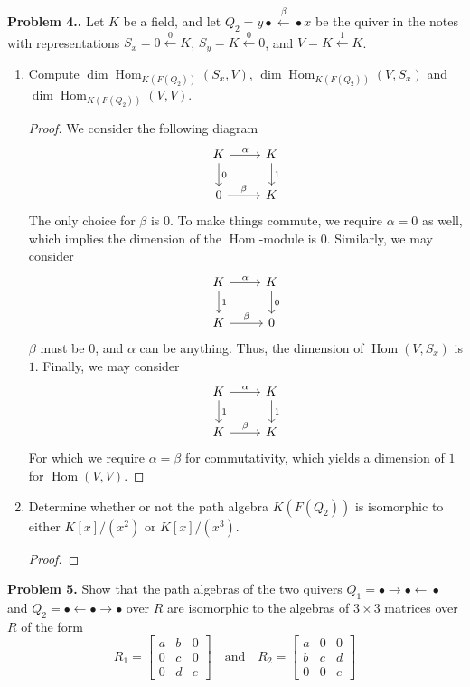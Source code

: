 \documentclass[reqno]{amsart}
\DeclareMathOperator{\Hom}{Hom}
\theoremstyle{definition}
\theoremstyle{remark}
\newcommand{\prob}[1] {
  \textbf{Problem #1.}
}
\begin{document}
\prob{4.} Let $K$ be a field, and let $Q_2 = y \bullet \xleftarrow{\beta}
\bullet x$ be the quiver in the notes with representations $S_x = 0
\xleftarrow{0} K$, $S_y = K \xleftarrow{0} 0$, and $V = K \xleftarrow{1} K$.

\begin{enumerate}
  \item Compute $\dim \Hom_{K(F(Q_2))}(S_x, V)$, $\dim \Hom_{K(F(Q_2))}(V, S_x)$
    and $\dim \Hom_{K(F(Q_2))}(V, V)$.
    \begin{proof}
      We consider the following diagram
      \[
        \begin{tikzcd}
          K \ar[d, "0"] \ar[r, "\alpha"] & K \ar[d, "1"] \\
          0 \ar[r, "\beta"] & K
        \end{tikzcd}
      \]
      The only choice for $\beta$ is $0$. To make things commute, we require
      $\alpha = 0$ as well, which implies the dimension of the $\Hom$-module is
      $0$. Similarly, we may consider
      \[
        \begin{tikzcd}
          K \ar[d, "1"] \ar[r, "\alpha"] & K \ar[d, "0"] \\
          K \ar[r, "\beta"] & 0
        \end{tikzcd}
      \]
      $\beta$ must be $0$, and $\alpha$ can be anything. Thus, the dimension of
      $\Hom(V, S_x)$ is $1$. Finally, we may consider
      \[
        \begin{tikzcd}
          K \ar[d, "1"] \ar[r, "\alpha"] & K \ar[d, "1"] \\
          K \ar[r, "\beta"] & K
        \end{tikzcd}
      \]
      For which we require $\alpha=\beta$ for commutativity, which yields a
      dimension of $1$ for $\Hom(V, V)$.
    \end{proof}

  \item Determine whether or not the path algebra $K(F(Q_2))$ is isomorphic to
    either $K[x]/(x^2)$ or $K[x]/(x^3)$.

    \begin{proof}

    \end{proof}
\end{enumerate}

\prob{5} Show that the path algebras of the two quivers $Q_1 = \bullet \to
\bullet \xleftarrow{} \bullet$ and $Q_2 = \bullet \xleftarrow{} \bullet \to
\bullet$ over $R$ are isomorphic to the algebras of $3 \times 3$ matrices over
$R$ of the form
\[
  R_1 = \begin{bmatrix}
    a & b & 0 \\
    0 & c & 0 \\
    0 & d & e
  \end{bmatrix}
  \quad\text{and}\quad
  R_2 = \begin{bmatrix}
    a & 0 & 0 \\
    b & c & d \\
    0 & 0 & e
  \end{bmatrix}
\]
\end{document}
